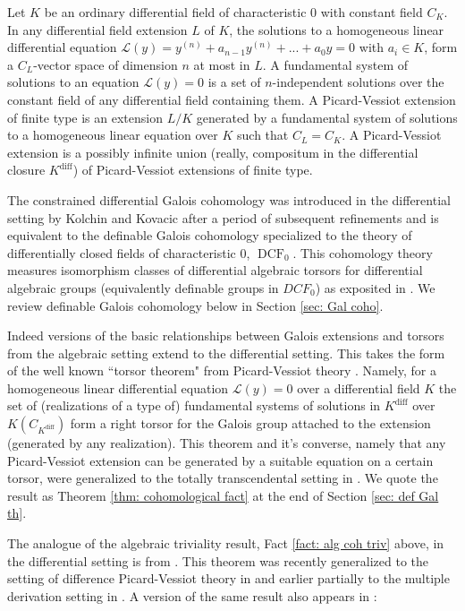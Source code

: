 \documentclass{amsart}
\theoremstyle{definition}
\theoremstyle{remark}
\numberwithin{equation}{section}
\def \diff {\operatorname{diff}}
\def \DCF {\operatorname{DCF}}
\begin{document}
Let $K$ be an ordinary differential field of characteristic $0$ with constant field $C_K$. In any differential field extension $L$ of $K$, the solutions to a homogeneous linear differential equation $\mathcal{L}(y) = y^{(n)} + a_{n-1}y^{(n)} + ... +a_0y = 0$ with $a_i \in K$, form a $C_L$-vector space of dimension $n$ at most in $L$. A fundamental system of solutions to an equation $\mathcal{L}(y) = 0$ is a set of $n$-independent solutions over the constant field of any differential field containing them. A Picard-Vessiot extension of finite type is an extension $L/K$ generated by a fundamental system of solutions to a homogeneous linear equation over $K$ such that $C_L=C_K$.  A Picard-Vessiot extension is a possibly infinite union (really, compositum in the differential closure $K^{\diff}$) of Picard-Vessiot extensions of finite type.

The constrained differential Galois cohomology was introduced in the differential setting by Kolchin and Kovacic after a period of subsequent refinements \cite{kolchin1985differential} and is equivalent to the definable Galois cohomology specialized to the theory of differentially closed fields of characteristic $0$, $\DCF_0$. This cohomology theory measures isomorphism classes of differential algebraic torsors for differential algebraic groups (equivalently definable groups in $DCF_0$) as exposited in \cite{kolchin1985differential}. We review definable Galois cohomology below in Section \ref{sec: Gal coho}.

Indeed versions of the basic relationships between Galois extensions and torsors from the algebraic setting extend to the differential setting. This takes the form of the well known ``torsor theorem" from Picard-Vessiot theory \cite{vdPS2003}. Namely, for a homogeneous linear differential equation $\mathcal{L}(y) = 0$ over a differential field $K$ the set of (realizations of a type of) fundamental systems of solutions in $K^{\diff}$ over $K(C_{K^{\diff}})$ form a right torsor for the Galois group attached to the extension (generated by any realization). This theorem and it's converse, namely that any Picard-Vessiot extension can be generated by a suitable equation on a certain torsor, were generalized to the totally transcendental setting in \cite{OmarDavid2026}. We quote the result as Theorem \ref{thm: cohomological fact} at the end of Section \ref{sec: def Gal th}. 

The analogue of the algebraic triviality result, Fact \ref{fact: alg coh triv} above, in the differential setting is from \cite{PILLAY2017809}. This theorem was recently generalized to the setting of difference Picard-Vessiot theory in \cite{Bachmayr_Wibmer_2026} and earlier partially to the multiple derivation setting in \cite{Chatzidakis2017GeneralizedPE}. A version of the same result also appears in \cite{Minchenko_2019}:
\end{document}
